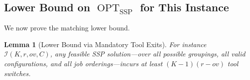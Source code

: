 \documentclass[11pt,a4paper]{article}
\theoremstyle{plain}
\newtheorem{lemma}[theorem]{Lemma}
\theoremstyle{definition}
\DeclareMathOperator{\OPT}{OPT}
\begin{document}
\subsection{Lower Bound on \texorpdfstring{$\OPT_{\mathrm{SSP}}$}{OPT-SSP} for This Instance}
\label{sec:LB}

We now prove the matching lower bound.

\begin{thmbox}
\begin{lemma}[Lower Bound via Mandatory Tool Exits]
\label{lem:LB}
For instance $\mathcal{I}(K,r,\mathit{ov},C)$, any feasible SSP solution---over
all possible groupings, all valid configurations, and all job orderings---incurs
at least $(K-1)(r-\mathit{ov})$ tool switches.
\end{lemma}
\end{thmbox}
\end{document}
